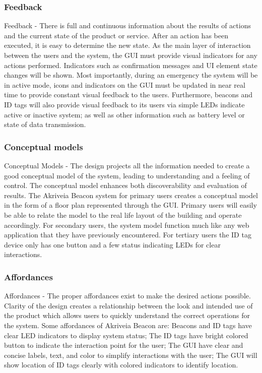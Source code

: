 \subsubsection{Feedback}
\medskip
Feedback - There is full and continuous information about the results of actions and the current state of the product or service. After an action has been executed, it is easy to determine the new state. As the main layer of interaction between the users and the system, the GUI must provide visual indicators for any actions performed. Indicators such as confirmation messages and UI element state changes will be shown. Most importantly, during an emergency the system will be in active mode, icons and indicators on the GUI must be updated in near real time to provide constant visual feedback to the users. Furthermore, beacons and ID tags will also provide visual feedback to its users via simple LEDs indicate active or inactive system; as well as other information such as battery level or state of data transmission. 
\pagebreak


\subsubsection{Conceptual models}
Conceptual Models - The design projects all the information needed to create a good conceptual model of the system, leading to understanding and a feeling of control. The conceptual model enhances both discoverability and evaluation of results. The Akriveia Beacon system for primary users creates a conceptual model in the form of a floor plan represented through the GUI. Primary users will easily be able to relate the model to the real life layout of the building and operate accordingly. For secondary users, the system model function much like any web application that they have previously encountered. For tertiary users the ID tag device only has one button and a few status indicating LEDs for clear interactions.
\medskip


\subsubsection{Affordances}
Affordances - The proper affordances exist to make the desired actions possible. Clarity of the design creates a relationship between the look and intended use of the product which allows users to quickly understand the correct operations for the system. Some affordances of Akriveia Beacon are: Beacons and ID tags have clear LED indicators to display system status; The ID tags have bright colored button to indicate the interaction point for the user; The GUI have clear and concise labels, text, and color to simplify interactions with the user; The GUI will show location of ID tags clearly with colored indicators to identify location.
\medskip


